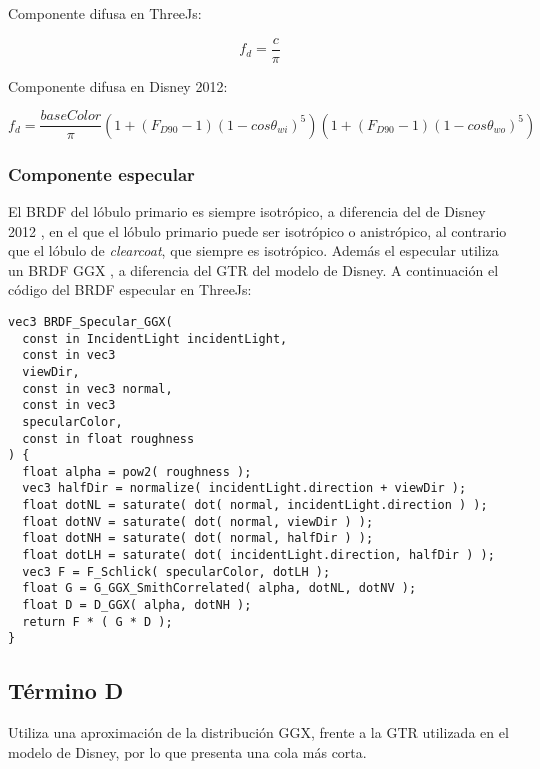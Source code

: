   Componente difusa en ThreeJs:

  \begin{equation}
    f_d = \frac{c}{\pi}
  \end{equation}
  \singlespacing

  Componente difusa en Disney 2012:

  \begin{equation}
    f_d = \frac{baseColor}{\pi}
    \left(  1 + (F_{D90} - 1)(1 - cos\theta_{wi})^5  \right)
    \left(  1 + (F_{D90} - 1)(1 - cos\theta_{wo})^5  \right)
  \end{equation}
  \singlespacing


  \subsubsection{Componente especular}
  El BRDF del l\'obulo primario es siempre isotr\'opico, a diferencia del de Disney 2012 \autocite{disney12}, en el que
  el l\'obulo primario puede ser isotr\'opico o anistr\'opico, al contrario que el l\'obulo de \textit{clearcoat},
  que siempre es isotr\'opico. Adem\'as el especular utiliza un BRDF GGX \autocite{ggx}, a diferencia del GTR \autocite{disney12} del modelo de Disney.
  A continuaci\'on el c\'odigo del BRDF especular en ThreeJs:

  \singlespacing
  \begin{lstlisting}[caption=Clase MeshClothMaterial]
vec3 BRDF_Specular_GGX(
  const in IncidentLight incidentLight,
  const in vec3
  viewDir,
  const in vec3 normal,
  const in vec3
  specularColor,
  const in float roughness
) {
  float alpha = pow2( roughness );
  vec3 halfDir = normalize( incidentLight.direction + viewDir );
  float dotNL = saturate( dot( normal, incidentLight.direction ) );
  float dotNV = saturate( dot( normal, viewDir ) );
  float dotNH = saturate( dot( normal, halfDir ) );
  float dotLH = saturate( dot( incidentLight.direction, halfDir ) );
  vec3 F = F_Schlick( specularColor, dotLH );
  float G = G_GGX_SmithCorrelated( alpha, dotNL, dotNV );
  float D = D_GGX( alpha, dotNH );
  return F * ( G * D );
}
  \end{lstlisting}
  \singlespacing

  \subsection*{T\'ermino D}
  Utiliza una aproximaci\'on de la distribuci\'on GGX, frente a la GTR utilizada en el modelo de Disney, por lo que
  presenta una cola m\'as corta.\\

